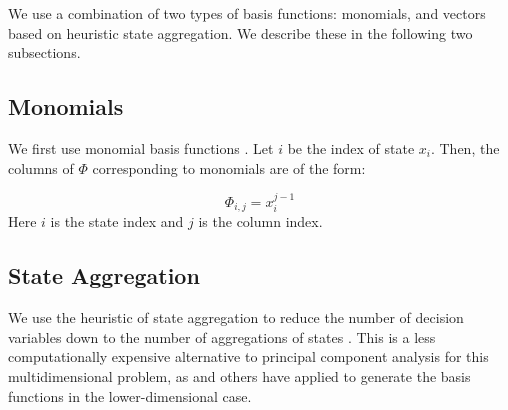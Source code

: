 \documentclass[conference]{IEEEtran}
\begin{document}
We use a combination of two types of basis functions: monomials, and vectors based on heuristic state aggregation. We describe these in the following two subsections.

\subsection{Monomials}
    We first use monomial basis functions \cite{bertsekas1995dynamic,478953}. Let $i$ be the index of state $x_{i}$. Then, the columns of $\Phi$ corresponding to monomials are of the form:
	
	\begin{displaymath}
        \Phi_{i,j}=x_{i}^{j-1}
    \end{displaymath} Here $i$ is the state index and $j$ is the column index. %



 \subsection{State Aggregation}
    
    We use the heuristic of state aggregation to reduce the number of decision variables down to the number of aggregations of states \cite{5717627}. This is a less computationally expensive alternative to principal component analysis for this multidimensional problem, as \cite{PCA2015} and others have applied to generate the basis functions in the lower-dimensional case.%
    
\end{document}
